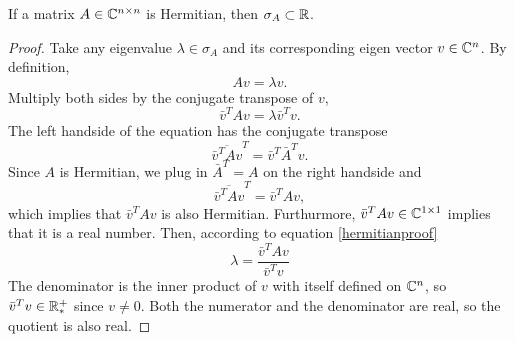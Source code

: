 \begin{theorem}
If a matrix \(A\in\mathbb{C}^{n\times n}\) is Hermitian, then \(\sigma_A\subset\mathbb{R}\).
\end{theorem}
\begin{proof}
Take any eigenvalue \(\lambda\in\sigma_A\) and its corresponding eigen vector \(v\in\mathbb{C}^n\).
By definition,
\begin{equation}
Av=\lambda v.
\end{equation}
Multiply both sides by the conjugate transpose of $v$,
\begin{equation}\label{hermitianproof}
\bar{v}^T Av=\lambda \bar{v}^T v.
\end{equation}
The left handside of the equation has the conjugate transpose
\begin{equation}
\overline{\bar{v}^T Av}^T=\bar{v}^T\bar{A}^T v.
\end{equation}
Since $A$ is Hermitian, we plug in \(\bar{A}^T=A\) on the right handside and
\begin{equation}
\overline{\bar{v}^T Av}^T=\bar{v}^TA v,
\end{equation}
which implies that \(\bar{v}^T Av\) is also Hermitian.
Furthurmore, \(\bar{v}^T Av\in\mathbb{C}^{1\times1}\) implies that it is a real number.
Then, according to equation \ref{hermitianproof}
\begin{equation}
\lambda=\frac{\bar{v}^T Av}{\bar{v}^T v}
\end{equation}
The denominator is the inner product of $v$ with itself defined on \(\mathbb{C}^n\), so \(\bar{v}^T v\in\mathbb{R}_*^+\) since \(v\neq0\).
Both the numerator and the denominator are real, so the quotient is also real.
\end{proof}
